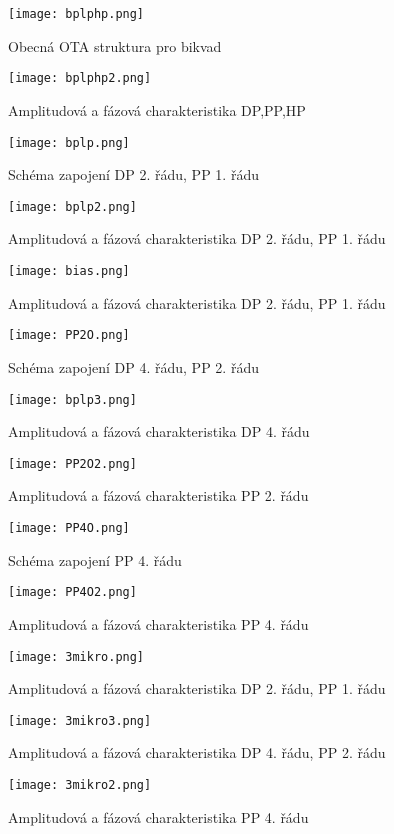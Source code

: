 \begin{figure}[h]
\centering
\texttt{[image: bplphp.png]}
\caption{Obecná OTA struktura pro bikvad\label{s:BIK1}}
\end{figure}
\begin{figure}[h]
\centering
\texttt{[image: bplphp2.png]}
\caption{Amplitudová a fázová charakteristika DP,PP,HP\label{s:BIK2}}
\end{figure}
\begin{figure}[h]
\centering
\texttt{[image: bplp.png]}
\caption{Schéma zapojení DP 2. řádu, PP 1. řádu}
\end{figure}
\begin{figure}[h]
\centering
\texttt{[image: bplp2.png]}
\caption{Amplitudová a fázová charakteristika DP 2. řádu, PP 1. řádu\label{s:PET}}
\end{figure}
\begin{figure}[h]
\centering
\texttt{[image: bias.png]}
\caption{Amplitudová a fázová charakteristika DP 2. řádu, PP 1. řádu\label{s:PET1}}
\end{figure}
\begin{figure}[h]
\centering
\texttt{[image: PP2O.png]}
\caption{Schéma zapojení DP 4. řádu, PP 2. řádu \label{s:DP4}}
\end{figure}
\begin{figure}[h]
\centering
\texttt{[image: bplp3.png]}
\caption{Amplitudová a fázová charakteristika DP 4. řádu}
\end{figure}
\begin{figure}[h]
\centering
\texttt{[image: PP2O2.png]}
\caption{Amplitudová a fázová charakteristika PP 2. řádu}
\end{figure}
\begin{figure}[h]
\centering
\texttt{[image: PP4O.png]}
\caption{Schéma zapojení PP 4. řádu \label{s:PP4}}
\end{figure}
\begin{figure}[h]
\centering
\texttt{[image: PP4O2.png]}
\caption{Amplitudová a fázová charakteristika PP 4. řádu}
\end{figure}
\begin{figure}[h]
\centering
\texttt{[image: 3mikro.png]}
\caption{Amplitudová a fázová charakteristika DP 2. řádu, PP 1. řádu \label{s:O1}}
\end{figure}
\begin{figure}[h]
\centering
\texttt{[image: 3mikro3.png]}
\caption{Amplitudová a fázová charakteristika DP 4. řádu, PP 2. řádu \label{s:O2}}
\end{figure}
\begin{figure}[h]
\centering
\texttt{[image: 3mikro2.png]}
\caption{Amplitudová a fázová charakteristika PP 4. řádu \label{s:O3}}
\end{figure}